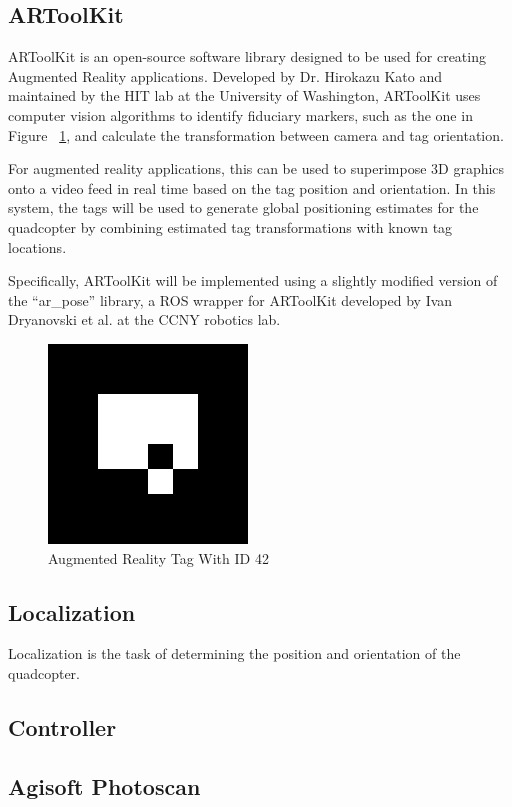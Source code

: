 \subsection{ARToolKit}
ARToolKit is an open-source software library designed to be used for creating Augmented Reality applications. Developed by Dr. Hirokazu Kato and maintained by the HIT lab at the University of Washington, ARToolKit uses computer vision algorithms to identify fiduciary markers, such as the one in Figure ~\ref{fig:artag}, and calculate the transformation between camera and tag orientation. 

For augmented reality applications, this can be used to superimpose 3D graphics onto a video feed in real time based on the tag position and orientation. In this system, the tags will be used to generate global positioning estimates for the quadcopter by combining estimated tag transformations with known tag locations.

Specifically, ARToolKit will be implemented using a slightly modified version of the ``ar\_pose'' library, a ROS wrapper for ARToolKit developed by Ivan Dryanovski et al. at the CCNY robotics lab.\cite{arpose}

\begin{figure}
        \centering
		\includegraphics[width=200px]{../images/artag.png}
        \caption{Augmented Reality Tag With ID 42}\label{fig:artag}
\end{figure}


\subsection{Localization}
Localization is the task of determining the position and orientation of the quadcopter. 

\subsection{Controller}

\subsection{Agisoft Photoscan}

